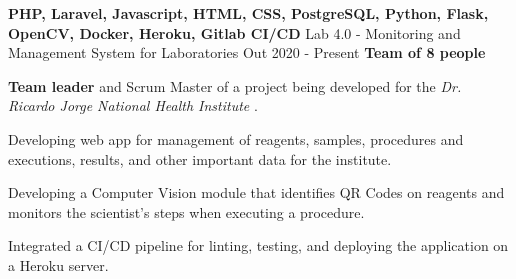   \cventry
    {\textbf{PHP, Laravel, Javascript, HTML, CSS, PostgreSQL, Python, Flask, OpenCV, Docker, Heroku, Gitlab CI/CD}} %
    {Lab 4.0 - Monitoring and Management System for Laboratories \href{https://laboratorio-4.herokuapp.com/}{\faExternalLink}} %
    {Out 2020 - Present} %
    {\textbf{Team of 8 people}} %
    {
      \begin{cvitems} %
        \item {\textbf{Team leader} and Scrum Master of a project being developed for the \textit{Dr. Ricardo Jorge National Health Institute} \href{http://www.insa.pt}{\faExternalLink}.}
        \item {Developing web app for management of reagents, samples, procedures and executions, results, and other important data for the institute.}
        \item {Developing a Computer Vision module that identifies QR Codes on reagents and monitors the scientist's steps when executing a procedure.}
        \item {Integrated a CI/CD pipeline for linting, testing, and deploying the application on a Heroku server.}
      \end{cvitems}
    }